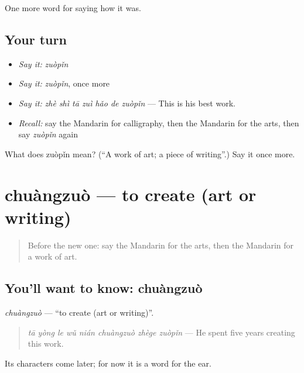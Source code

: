 \begin{grammarlens}[title={What you've built}]
One more word for saying how it was.
\end{grammarlens}

\subsection*{Your turn}
\begin{itemize}
\raggedright
  \item \emph{Say it:} \emph{zuòpǐn}
  \item \emph{Say it:} \emph{zuòpǐn}, once more
  \item \emph{Say it:} \emph{zhè shì tā zuì hǎo de zuòpǐn} — This is his best work.
  \item \emph{Recall:} say the Mandarin for calligraphy, then the Mandarin for the arts, then say \emph{zuòpǐn} again
\end{itemize}

\begin{tcolorbox}[breakable,colback=teal!4,colframe=teal!35!black,title={Before you move on}]
What does zuòpǐn mean? (\textquotedblleft{}A work of art; a piece of writing\textquotedblright{}.) Say it once more.
\end{tcolorbox}
\section[chuàngzuò]{chuàngzuò — to create (art or writing)}

\label{lesson:ZH-C503-chuangzuo}



\begin{quote}
Before the new one: say the Mandarin for the arts, then the Mandarin for a work of art.
\end{quote}

\subsection*{You'll want to know: chuàngzuò}
\emph{chuàngzuò} — \textquotedblleft{}to create (art or writing)\textquotedblright{}.

\begin{quote}
\emph{tā yòng le wǔ nián chuàngzuò zhège zuòpǐn} — He spent five years creating this work.
\end{quote}

Its characters come later; for now it is a word for the ear.

